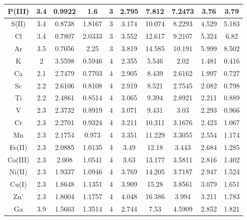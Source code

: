 \documentclass[journal]{IEEEtran}
\begin{document}
{\begin{longtable}{|c|c|c|c|c|c|c|c|c|c|}
			\hline
	\rowcolor{yellow!50}	P(III)   & 3.4 & 0.9922 & 1.6    & 3 & 2.795  & 7.812   & 7.2473  & 3.76   & 3.79    \\
			\hline
	\rowcolor{yellow!50}	S(II)    & 3.4 & 0.8738 & 1.8167 & 3 & 3.174  & 10.074  & 8.2293  & 4.529  & 5.183   \\
			\hline
	\rowcolor{yellow!50}	Cl       & 3.4 & 0.7807 & 2.0333 & 3 & 3.552  & 12.617  & 9.2107  & 5.324  & 6.82    \\
			\hline
	\rowcolor{yellow!50}	Ar       & 3.5 & 0.7056 & 2.25   & 3 & 3.819  & 14.585  & 10.191  & 5.999  & 8.502   \\
			\hline
	\rowcolor{green!50}	K        & 2   & 3.5598 & 0.5946 & 4 & 2.355  & 5.546   & 2.02    & 1.481  & 0.416   \\
			\hline
		\rowcolor{green!50}	Ca       & 2.1 & 2.7479 & 0.7703 & 4 & 2.905  & 8.439   & 2.6162  & 1.997  & 0.727   \\
			\hline
		\rowcolor{green!50}	Sc       & 2.2 & 2.6106 & 0.8108 & 4 & 2.919  & 8.521   & 2.7545  & 2.082  & 0.798   \\
			\hline
		\rowcolor{green!50}	Ti       & 2.2 & 2.4861 & 0.8514 & 4 & 3.065  & 9.394   & 2.8921  & 2.211  & 0.889   \\
			\hline
	\rowcolor{green!50}	V        & 2.3 & 2.3732 & 0.8919 & 4 & 3.071  & 9.431   & 3.03    & 2.293  & 0.966   \\
			\hline
		\rowcolor{green!50}	Cr       & 2.3 & 2.2701 & 0.9324 & 4 & 3.211  & 10.311  & 3.1676  & 2.423  & 1.067   \\
			\hline
	\rowcolor{yellow!50}	Mn       & 2.3 & 2.1754 & 0.973  & 4 & 3.351  & 11.229  & 3.3055  & 2.554  & 1.174   \\
			\hline
	\rowcolor{yellow!50}	Fe(II)   & 2.3 & 2.0885 & 1.0135 & 4 & 3.49   & 12.18   & 3.443   & 2.684  & 1.285   \\
			\hline
	\rowcolor{yellow!50}	Co(III)  & 2.3 & 2.008  & 1.0541 & 4 & 3.63   & 13.177  & 3.5811  & 2.816  & 1.402   \\
			\hline
	\rowcolor{yellow!50}	Ni(II)   & 2.3 & 1.9337 & 1.0946 & 4 & 3.769  & 14.205  & 3.7187  & 2.947  & 1.524   \\
			\hline
	\rowcolor{yellow!50}	Cu(I)    & 2.3 & 1.8648 & 1.1351 & 4 & 3.909  & 15.28   & 3.8561  & 3.079  & 1.651   \\
			\hline
	\rowcolor{yellow!50}	Zn'      & 2.3 & 1.8004 & 1.1757 & 4 & 4.048  & 16.386  & 3.994   & 3.211  & 1.783   \\
			\hline
	\rowcolor{yellow!50}	Ga       & 3.9 & 1.5663 & 1.3514 & 4 & 2.744  & 7.53    & 4.5909  & 2.852  & 1.821   \\

\end{longtable}}
\end{document}
